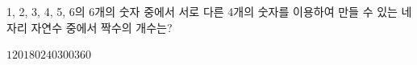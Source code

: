 1, 2, 3, 4, 5, 6의 6개의 숫자 중에서 서로 다른 4개의 숫자를 이용하여 만들 수 있는 네 자리 자연수 중에서 짝수의 개수는?
\begin{choices32}{$120$}{$180$}{$240$}{$300$}{$360$}\end{choices32}
